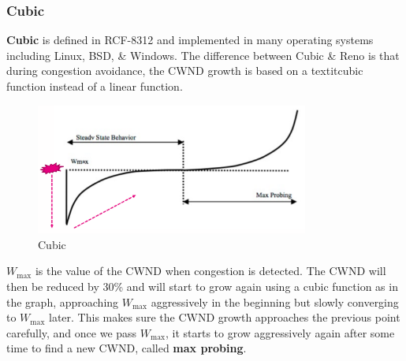 \documentclass[a4paper,11pt]{article}
\begin{document}
\subsubsection{Cubic}
\textbf{Cubic} is defined in RCF-8312 and implemented in many operating systems including Linux, BSD, \& Windows.
The difference between Cubic \& Reno is that during congestion avoidance, the CWND growth is based on a textit{cubic} function instead of a linear function.

\begin{figure}[H]
    \centering
    \includegraphics[width=0.8\textwidth]{./images/cubic.png}
    \caption{Cubic}
\end{figure}

$W_{\text{max}}$ is the value of the CWND when congestion is detected.
The CWND will then be reduced by 30\% and will start to grow again using a cubic function as in the graph, approaching $W_{\text{max}}$ aggressively in the beginning but slowly converging to $W_{\text{max}}$ later.
This makes sure the CWND growth approaches the previous point carefully, and once we pass $W_{\text{max}}$, it starts to grow aggressively again after some time to find a new CWND, called \textbf{max probing}.
\end{document}
